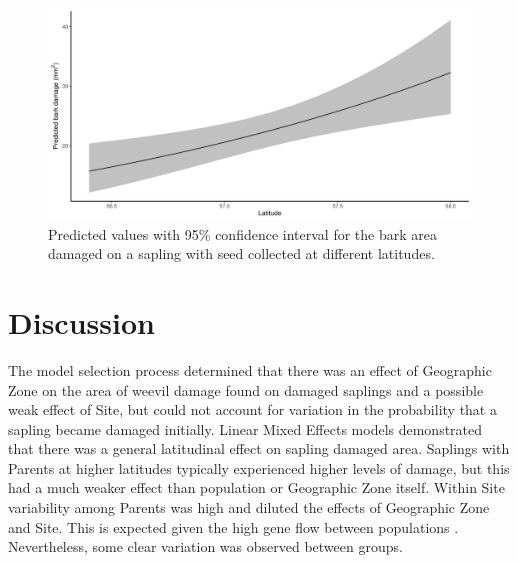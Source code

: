 \documentclass[a4paper, 11pt]{article}
\begin{document}
\begin{figure}[H]
	\includegraphics[width=\textwidth]{pred_lat}
	\caption{Predicted values with 95\% confidence interval for the bark area damaged on a sapling with seed  collected at different latitudes.}
\end{figure}

\section*{Discussion}

The model selection process determined that there was an effect of Geographic Zone on the area of weevil damage found on damaged saplings and a possible weak effect of Site, but could not account for variation in the probability that a sapling became damaged initially. Linear Mixed Effects models demonstrated that there was a general latitudinal effect on sapling damaged area. Saplings with Parents at higher latitudes typically experienced higher levels of damage, but this had a much weaker effect than population or Geographic Zone itself. Within Site variability among Parents was high and diluted the effects of Geographic Zone and Site. This is expected given the high gene flow between populations \citep{Donnelly2018}. Nevertheless, some clear variation was observed between groups.
\end{document}

